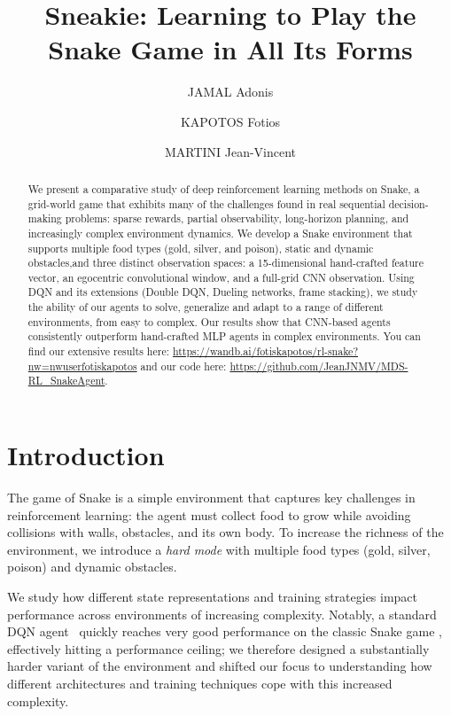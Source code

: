 \documentclass[runningheads]{llncs}
\begin{document}
\title{Sneakie: Learning to Play the Snake Game in All Its Forms}

\author{JAMAL Adonis \and  KAPOTOS Fotios \and MARTINI Jean-Vincent }
\maketitle

\begin{abstract}
We present a comparative study of deep reinforcement learning methods on Snake,
a grid-world game that exhibits many of the challenges found in real sequential
decision-making problems: sparse rewards, partial observability, long-horizon
planning, and increasingly complex environment dynamics.
We develop a Snake environment that supports multiple food types (gold, silver, and poison), static and dynamic obstacles,and three distinct observation spaces: a 15-dimensional hand-crafted feature
vector, an egocentric convolutional window, and a full-grid CNN observation.
Using DQN and its extensions (Double DQN, Dueling networks, frame stacking), we study the ability of our agents to solve, generalize and adapt to a range of different environments, from easy to complex.
Our results show that CNN-based agents consistently outperform hand-crafted
MLP agents in complex environments.
You can find our extensive results here: \url{https://wandb.ai/fotiskapotos/rl-snake?nw=nwuserfotiskapotos} and our code here: \url{https://github.com/JeanJNMV/MDS-RL_SnakeAgent}.
\end{abstract}

\section{Introduction}
\label{sec:intro}

The game of Snake is a simple environment that captures key challenges in
reinforcement learning: the agent must collect food to grow while avoiding
collisions with walls, obstacles, and its own body.
To increase the richness of the environment, we introduce a \emph{hard mode}
with multiple food types (gold, silver, poison) and dynamic obstacles.

We study how different state representations and training strategies impact
performance across environments of increasing complexity.
Notably, a standard DQN agent~\cite{mnih2015human} quickly reaches very good performance on the classic Snake game \cite{wei2018autonomous}, effectively hitting a performance ceiling; we therefore designed a substantially harder variant of the environment and shifted our focus to understanding how different architectures and training techniques cope with this increased complexity.
\end{document}
